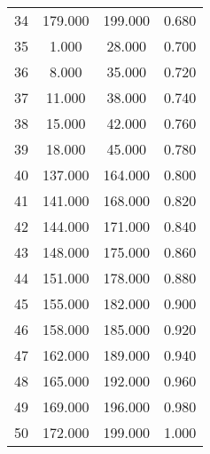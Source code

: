 \begin{tabular}{cccc}
  34 & 179.000 & 199.000 & 0.680 \\ 
  35 & 1.000 & 28.000 & 0.700 \\ 
  36 & 8.000 & 35.000 & 0.720 \\ 
  37 & 11.000 & 38.000 & 0.740 \\ 
  38 & 15.000 & 42.000 & 0.760 \\ 
  39 & 18.000 & 45.000 & 0.780 \\ 
  40 & 137.000 & 164.000 & 0.800 \\ 
  41 & 141.000 & 168.000 & 0.820 \\ 
  42 & 144.000 & 171.000 & 0.840 \\ 
  43 & 148.000 & 175.000 & 0.860 \\ 
  44 & 151.000 & 178.000 & 0.880 \\ 
  45 & 155.000 & 182.000 & 0.900 \\ 
  46 & 158.000 & 185.000 & 0.920 \\ 
  47 & 162.000 & 189.000 & 0.940 \\ 
  48 & 165.000 & 192.000 & 0.960 \\ 
  49 & 169.000 & 196.000 & 0.980 \\ 
  50 & 172.000 & 199.000 & 1.000 \\ 
   \hline
\end{tabular}
